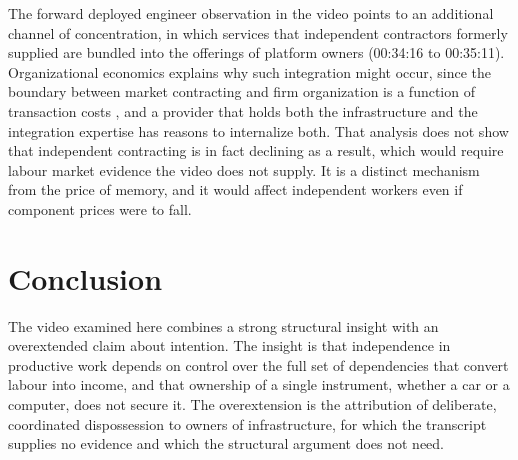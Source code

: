 \documentclass[11pt]{article}
\theoremstyle{plain}
\theoremstyle{definition}
\begin{document}
The forward deployed engineer observation in the video points to an additional channel of concentration, in which services that independent contractors formerly supplied are bundled into the offerings of platform owners (00:34:16 to 00:35:11). Organizational economics explains why such integration might occur, since the boundary between market contracting and firm organization is a function of transaction costs \cite{coase}, and a provider that holds both the infrastructure and the integration expertise has reasons to internalize both. That analysis does not show that independent contracting is in fact declining as a result, which would require labour market evidence the video does not supply. It is a distinct mechanism from the price of memory, and it would affect independent workers even if component prices were to fall.

\section{Conclusion}

The video examined here combines a strong structural insight with an overextended claim about intention. The insight is that independence in productive work depends on control over the full set of dependencies that convert labour into income, and that ownership of a single instrument, whether a car or a computer, does not secure it. The overextension is the attribution of deliberate, coordinated dispossession to owners of infrastructure, for which the transcript supplies no evidence and which the structural argument does not need.
\end{document}
